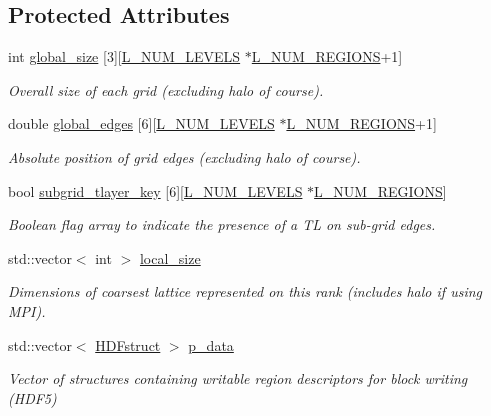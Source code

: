 \subsection*{Protected Attributes}
\begin{DoxyCompactItemize}
\item 
int \hyperlink{class_grid_manager_a2b0bb9ddb852502444c8ea80ece661cd}{global\+\_\+size} \mbox{[}3\mbox{]}\mbox{[}\hyperlink{definitions_8h_a2ce7c3facc5f789b0e201757516539a5}{L\+\_\+\+N\+U\+M\+\_\+\+L\+E\+V\+E\+LS} $\ast$\hyperlink{definitions_8h_a3efeae83589481193d81da498e7f746a}{L\+\_\+\+N\+U\+M\+\_\+\+R\+E\+G\+I\+O\+NS}+1\mbox{]}
\begin{DoxyCompactList}\small\item\em Overall size of each grid (excluding halo of course). \end{DoxyCompactList}\item 
double \hyperlink{class_grid_manager_af356c317de941f23795781ecfd6f3d25}{global\+\_\+edges} \mbox{[}6\mbox{]}\mbox{[}\hyperlink{definitions_8h_a2ce7c3facc5f789b0e201757516539a5}{L\+\_\+\+N\+U\+M\+\_\+\+L\+E\+V\+E\+LS} $\ast$\hyperlink{definitions_8h_a3efeae83589481193d81da498e7f746a}{L\+\_\+\+N\+U\+M\+\_\+\+R\+E\+G\+I\+O\+NS}+1\mbox{]}
\begin{DoxyCompactList}\small\item\em Absolute position of grid edges (excluding halo of course). \end{DoxyCompactList}\item 
bool \hyperlink{class_grid_manager_ae565f61d3e52998561d6a19ee58c21bb}{subgrid\+\_\+tlayer\+\_\+key} \mbox{[}6\mbox{]}\mbox{[}\hyperlink{definitions_8h_a2ce7c3facc5f789b0e201757516539a5}{L\+\_\+\+N\+U\+M\+\_\+\+L\+E\+V\+E\+LS} $\ast$\hyperlink{definitions_8h_a3efeae83589481193d81da498e7f746a}{L\+\_\+\+N\+U\+M\+\_\+\+R\+E\+G\+I\+O\+NS}\mbox{]}
\begin{DoxyCompactList}\small\item\em Boolean flag array to indicate the presence of a TL on sub-\/grid edges. \end{DoxyCompactList}\item 
std\+::vector$<$ int $>$ \hyperlink{class_grid_manager_a2994b896500f533e6f099c9d0cef027e}{local\+\_\+size}
\begin{DoxyCompactList}\small\item\em Dimensions of coarsest lattice represented on this rank (includes halo if using M\+PI). \end{DoxyCompactList}\item 
std\+::vector$<$ \hyperlink{struct_h_d_fstruct}{H\+D\+Fstruct} $>$ \hyperlink{class_grid_manager_a78b9e09992413a10e68213f4ddc78ade}{p\+\_\+data}
\begin{DoxyCompactList}\small\item\em Vector of structures containing writable region descriptors for block writing (H\+D\+F5) \end{DoxyCompactList}\end{DoxyCompactItemize}
